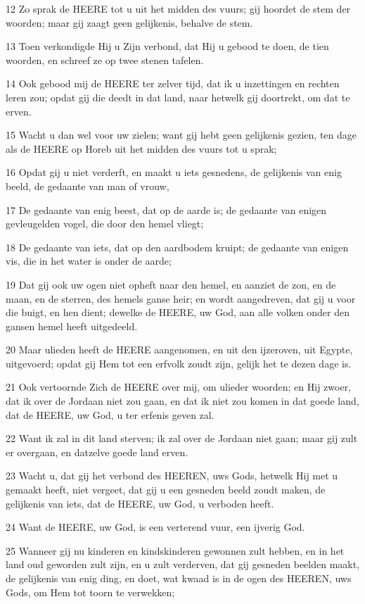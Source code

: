 \par 12 Zo sprak de HEERE tot u uit het midden des vuurs; gij hoordet de stem der woorden; maar gij zaagt geen gelijkenis, behalve de stem.
\par 13 Toen verkondigde Hij u Zijn verbond, dat Hij u gebood te doen, de tien woorden, en schreef ze op twee stenen tafelen.
\par 14 Ook gebood mij de HEERE ter zelver tijd, dat ik u inzettingen en rechten leren zou; opdat gij die deedt in dat land, naar hetwelk gij doortrekt, om dat te erven.
\par 15 Wacht u dan wel voor uw zielen; want gij hebt geen gelijkenis gezien, ten dage als de HEERE op Horeb uit het midden des vuurs tot u sprak;
\par 16 Opdat gij u niet verderft, en maakt u iets gesnedens, de gelijkenis van enig beeld, de gedaante van man of vrouw,
\par 17 De gedaante van enig beest, dat op de aarde is; de gedaante van enigen gevleugelden vogel, die door den hemel vliegt;
\par 18 De gedaante van iets, dat op den aardbodem kruipt; de gedaante van enigen vis, die in het water is onder de aarde;
\par 19 Dat gij ook uw ogen niet opheft naar den hemel, en aanziet de zon, en de maan, en de sterren, des hemels ganse heir; en wordt aangedreven, dat gij u voor die buigt, en hen dient; dewelke de HEERE, uw God, aan alle volken onder den gansen hemel heeft uitgedeeld.
\par 20 Maar ulieden heeft de HEERE aangenomen, en uit den ijzeroven, uit Egypte, uitgevoerd; opdat gij Hem tot een erfvolk zoudt zijn, gelijk het te dezen dage is.
\par 21 Ook vertoornde Zich de HEERE over mij, om ulieder woorden; en Hij zwoer, dat ik over de Jordaan niet zou gaan, en dat ik niet zou komen in dat goede land, dat de HEERE, uw God, u ter erfenis geven zal.
\par 22 Want ik zal in dit land sterven; ik zal over de Jordaan niet gaan; maar gij zult er overgaan, en datzelve goede land erven.
\par 23 Wacht u, dat gij het verbond des HEEREN, uws Gods, hetwelk Hij met u gemaakt heeft, niet vergeet, dat gij u een gesneden beeld zoudt maken, de gelijkenis van iets, dat de HEERE, uw God, u verboden heeft.
\par 24 Want de HEERE, uw God, is een verterend vuur, een ijverig God.
\par 25 Wanneer gij nu kinderen en kindskinderen gewonnen zult hebben, en in het land oud geworden zult zijn, en u zult verderven, dat gij gesneden beelden maakt, de gelijkenis van enig ding, en doet, wat kwaad is in de ogen des HEEREN, uws Gods, om Hem tot toorn te verwekken;
